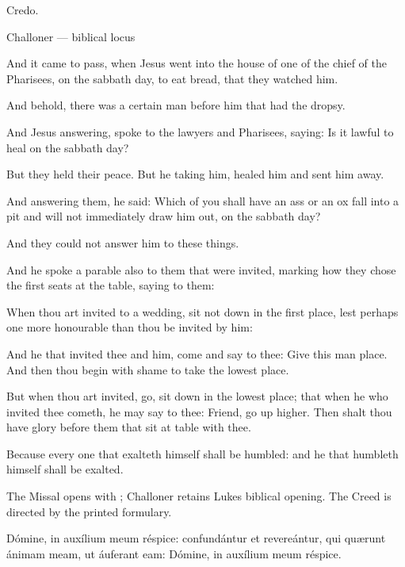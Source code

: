 Credo.

\finishfulltextelement

\begin{fulltextenglish}{Challoner --- biblical locus}

And it came to pass, when Jesus went into the house of one of the chief of the Pharisees, on the sabbath day, to eat bread, that they watched him.

And behold, there was a certain man before him that had the dropsy.

And Jesus answering, spoke to the lawyers and Pharisees, saying: Is it lawful to heal on the sabbath day?

But they held their peace. But he taking him, healed him and sent him away.

And answering them, he said: Which of you shall have an ass or an ox fall into a pit and will not immediately draw him out, on the sabbath day?

And they could not answer him to these things.

And he spoke a parable also to them that were invited, marking how they chose the first seats at the table, saying to them:

When thou art invited to a wedding, sit not down in the first place, lest perhaps one more honourable than thou be invited by him:

And he that invited thee and him, come and say to thee: Give this man place. And then thou begin with shame to take the lowest place.

But when thou art invited, go, sit down in the lowest place; that when he who invited thee cometh, he may say to thee: Friend, go up higher. Then shalt thou have glory before them that sit at table with thee.

Because every one that exalteth himself shall be humbled: and he that humbleth himself shall be exalted.

\end{fulltextenglish}

The Missal opens with ; Challoner retains Luke\textquotesingle s biblical opening. The Creed is directed by the printed formulary.



Dómine, in auxílium meum réspice: confundántur et revereántur, qui
quærunt ánimam meam, ut áuferant eam: Dómine, in auxílium meum réspice.

